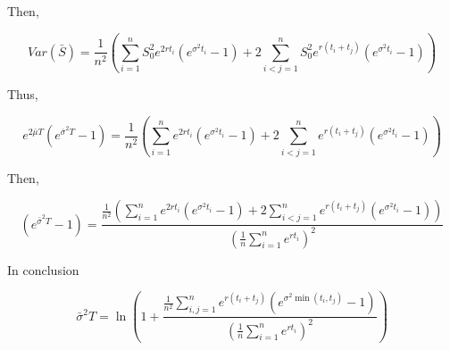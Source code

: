 \documentclass{article}
\begin{document}
\noindent Then,

\begin{equation}
	Var\left(\bar{S}\right) =\frac{1}{n^2} \left(\sum_{i=1}^{n} S_0^2 e^{2r t_i} \left(e^{ \sigma^2t_i} -1\right) + 2 \sum_{i<j=1}^{n}  S_0^2 e^{r\left(t_i + t_j\right)} \left(e^{\sigma^2 t_i} - 1\right) \right)
\end{equation}

\noindent Thus,

\begin{equation}
	e^{2\bar{\mu}T}\left( e^{\bar{\sigma}^2 T} - 1\right) = \frac{1}{n^2} \left(\sum_{i=1}^{n} e^{2r t_i} \left(e^{ \sigma^2t_i} -1\right) + 2 \sum_{i<j=1}^{n} e^{r\left(t_i + t_j\right)} \left(e^{\sigma^2 t_i} - 1\right) \right)
\end{equation}

\noindent Then,

\begin{equation}
	\left( e^{\bar{\sigma}^2 T} - 1\right) = \frac{\frac{1}{n^2} \left(\sum_{i=1}^{n} e^{2r t_i} \left(e^{ \sigma^2t_i} -1\right) + 2 \sum_{i<j=1}^{n} e^{r\left(t_i + t_j\right)} \left(e^{\sigma^2 t_i} - 1\right) \right)}{\left(\frac{1}{n} \sum_{i=1}^{n} e^{rt_i}\right)^2}
\end{equation}

\noindent In conclusion

\begin{equation}
	\bar{\sigma}^2 T = \ln\left(1+\frac{\frac{1}{n^2}\sum_{i,j=1}^{n} e^{r \left(t_i+t_j\right)} \left(e^{ \sigma^2\min\left(t_i,t_j\right)} -1\right)}{\left(\frac{1}{n} \sum_{i=1}^{n} e^{rt_i}\right)^2}\right)
\end{equation}
\end{document}
